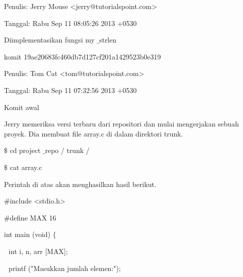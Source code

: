 \noindent 
Penulis: Jerry Mouse <jerry@tutorialspoint.com> \par
\noindent 
Tanggal: Rabu Sep 11 08:05:26 2013 +0530 \par
\vspace{12pt}
\noindent 
Diimplementasikan fungsi my $  \_  $strlen \par
\vspace{12pt}
\vspace{12pt}
\noindent 
komit 19ae20683fc460db7d127cf201a1429523b0e319 \par
\noindent 
Penulis: Tom Cat <tom@tutorialspoint.com> \par
\noindent 
Tanggal: Rabu Sep 11 07:32:56 2013 +0530 \par
\vspace{12pt}
\noindent 
Komit awal \par
\vspace{12pt}
\vspace{12pt}
\vspace{12pt}
\vspace{12pt}
\vspace{12pt}
\noindent 
Jerry memeriksa versi terbaru dari repositori dan mulai mengerjakan sebuah proyek. Dia membuat file array.c di dalam direktori trunk. \par
\vspace{12pt}
  $  \$  $ cd project $  \_  $repo / trunk / \par
\vspace{12pt}
  $  \$  $ cat array.c \par
\noindent 
Perintah di atas akan menghasilkan hasil berikut. \par
\vspace{12pt}
\noindent 
 \hspace*{0.5in}  $  \#  $include <stdio.h> \par
\noindent 
 \hspace*{0.5in}  $  \#  $define MAX 16 \par
\vspace{12pt}
\noindent 
 \hspace*{0.5in} int main (void)  $  \{  $ \par
\noindent 
 \hspace*{0.5in}  $  $ $  $ $  $int i, n, arr [MAX]; \par
\noindent 
 \hspace*{0.5in}  $  $ $  $ $  $printf ("Masukkan jumlah elemen:"); \par
